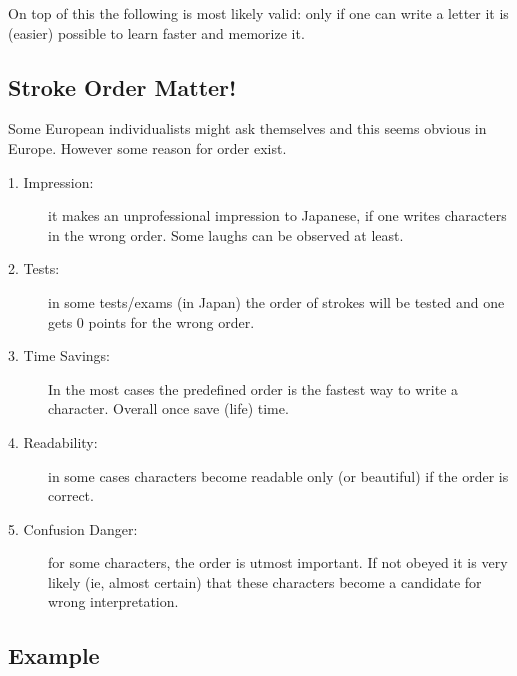 On top of this the following is most likely valid: only if one can write a
letter it is (easier) possible to learn faster and memorize it.


\subsection{Stroke Order Matter!}
\label{sec:StrokeOrderMatter}

Some European individualists might ask themselves \textit{} and this seems obvious
in Europe. However some reason for order exist.


\begin{description}

\item[1. Impression:] it makes an unprofessional impression to Japanese, if one
writes characters in the wrong order. Some laughs can be observed at least.

\item[2. Tests:]  in some tests/exams (in Japan) the order of strokes will be
tested and one gets 0 points for the wrong order.

\item[3. Time Savings:] In the most cases the predefined order is the fastest
way to write a character. Overall once save (life) time.

\item[4. Readability:] in some cases characters become readable only (or
beautiful) if the order is correct.

\item[5. Confusion Danger:] for some characters, the order is utmost
important. If not obeyed it is very likely (ie, almost certain) that these
characters become a candidate for wrong interpretation.

\end{description}
\normalsize

\newpage
\subsection{Example  }
\label{subsec:ExampleU}

